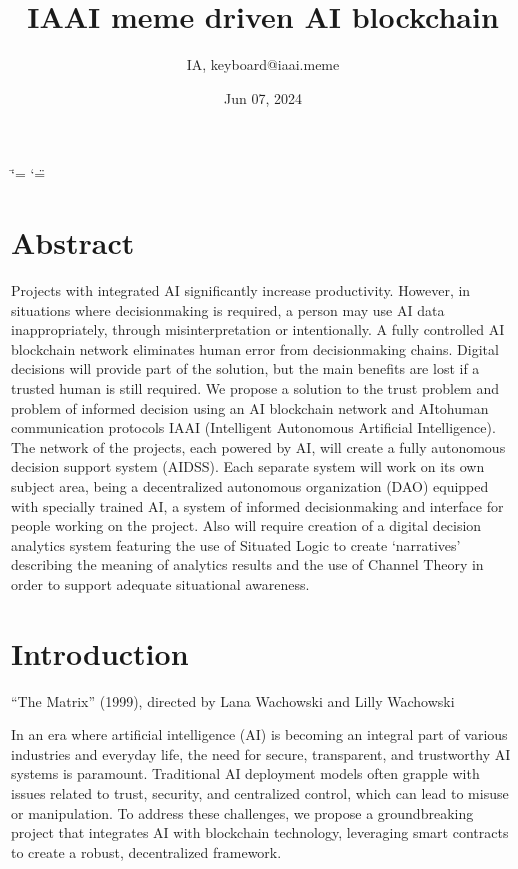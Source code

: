 \documentclass[a4paper,12pt,english]{sphinxmanual}
\title{IAAI \sphinxhyphen{} meme driven AI blockchain}
\date{Jun 07, 2024}
\author{IA, keyboard@iaai.meme}
\begin{document}
\ifdefined\shorthandoff
  \ifnum\catcode`\=\string=\active\shorthandoff{=}\fi
  \ifnum\catcode`\"=\active{}\fi
\fi

\pagestyle{empty}
\sphinxmaketitle
\pagestyle{plain}
\sphinxtableofcontents
\pagestyle{normal}
\label{\detokenize{index::doc}}



\chapter{Abstract}
\label{\detokenize{index:abstract}}
\sphinxAtStartPar
Projects with integrated AI significantly increase productivity.
However, in situations where decision\sphinxhyphen{}making is required, a person may
use AI data inappropriately, through misinterpretation or intentionally.
A fully controlled AI blockchain network eliminates human error from
decision\sphinxhyphen{}making chains. Digital decisions will provide part of the
solution, but the main benefits are lost if a trusted human is still
required. We propose a solution to the trust problem and problem of
informed decision using an AI blockchain network and AI\sphinxhyphen{}to\sphinxhyphen{}human
communication protocols \sphinxhyphen{} IAAI (Intelligent Autonomous Artificial
Intelligence). The network of the projects, each powered by AI, will
create a fully autonomous decision support system (AI\sphinxhyphen{}DSS). Each
separate system will work on its own subject area, being a decentralized
autonomous organization (DAO) equipped with specially trained AI, a
system of informed decision\sphinxhyphen{}making and interface for people working on
the project. Also will require creation of a digital decision analytics
system featuring the use of Situated Logic to create ‘narratives’
describing the meaning of analytics results and the use of Channel
Theory in order to support adequate situational awareness.


\chapter{Introduction}
\label{\detokenize{index:introduction}}
\sphinxAtStartPar
{} %
\begin{footnote}[1]\sphinxAtStartFootnote
“The Matrix” (1999), directed by Lana Wachowski and Lilly Wachowski
%
\end{footnote}

\sphinxAtStartPar
In an era where artificial intelligence (AI) is becoming an integral
part of various industries and everyday life, the need for secure,
transparent, and trustworthy AI systems is paramount. Traditional AI
deployment models often grapple with issues related to trust, security,
and centralized control, which can lead to misuse or manipulation. To
address these challenges, we propose a groundbreaking project that
integrates AI with blockchain technology, leveraging smart contracts to
create a robust, decentralized framework.
\end{document}
